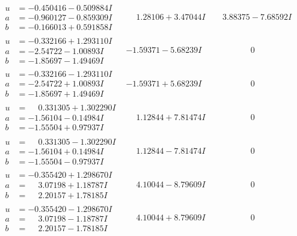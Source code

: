 \documentclass[1p]{elsarticle_modified}
\theoremstyle{definition}
\begin{document}
$$\begin{array}{c|c|c}
\begin{aligned}
u &= -0.450416 - 0.509884 I \\
a &= -0.960127 - 0.859309 I \\
b &= -0.166013 + 0.591858 I\end{aligned}
 & \phantom{-}1.28106 + 3.47044 I & \phantom{-}3.88375 - 7.68592 I \\ \hline\begin{aligned}
u &= -0.332166 + 1.293110 I \\
a &= -2.54722 - 1.00893 I \\
b &= -1.85697 - 1.49469 I\end{aligned}
 & -1.59371 - 5.68239 I & \phantom{-0.000000 } 0 \\ \hline\begin{aligned}
u &= -0.332166 - 1.293110 I \\
a &= -2.54722 + 1.00893 I \\
b &= -1.85697 + 1.49469 I\end{aligned}
 & -1.59371 + 5.68239 I & \phantom{-0.000000 } 0 \\ \hline\begin{aligned}
u &= \phantom{-}0.331305 + 1.302290 I \\
a &= -1.56104 - 0.14984 I \\
b &= -1.55504 + 0.97937 I\end{aligned}
 & \phantom{-}1.12844 + 7.81474 I & \phantom{-0.000000 } 0 \\ \hline\begin{aligned}
u &= \phantom{-}0.331305 - 1.302290 I \\
a &= -1.56104 + 0.14984 I \\
b &= -1.55504 - 0.97937 I\end{aligned}
 & \phantom{-}1.12844 - 7.81474 I & \phantom{-0.000000 } 0 \\ \hline\begin{aligned}
u &= -0.355420 + 1.298670 I \\
a &= \phantom{-}3.07198 + 1.18787 I \\
b &= \phantom{-}2.20157 + 1.78185 I\end{aligned}
 & \phantom{-}4.10044 - 8.79609 I & \phantom{-0.000000 } 0 \\ \hline\begin{aligned}
u &= -0.355420 - 1.298670 I \\
a &= \phantom{-}3.07198 - 1.18787 I \\
b &= \phantom{-}2.20157 - 1.78185 I\end{aligned}
 & \phantom{-}4.10044 + 8.79609 I & \phantom{-0.000000 } 0\\

\end{array}$$
\end{document}
